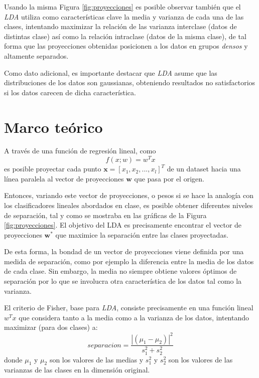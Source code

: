 \documentclass[journal]{IEEEtran}
\begin{document}
Usando la misma Figura \ref{fig:proyecciones} es posible observar también que el \emph{LDA} utiliza como características clave la media y varianza de cada una de las clases, intentando maximizar la relación de las varianza interclase (datos de distintas clase) así como la relación intraclase (datos de la misma clase), de tal forma que las proyecciones obtenidas posicionen a los datos en grupos \emph{densos} y altamente separados.

Como dato adicional, es importante destacar que \emph{LDA} asume que las distribuciones de los datos son gaussianas, obteniendo resultados no satisfactorios si los datos carecen de dicha característica.

\section{Marco teórico}
A través de una función de regresión lineal, como $$f(x;w) = w^Tx$$ es posible proyectar cada punto $\mathbf{x} = [x_1,x_2,...,x_l]^T$ de un dataset hacia una línea paralela al vector de proyecciones $\mathbf{w}$ que pasa por el origen.

Entonces, variando este vector de proyecciones, o pesos si se hace la analogía con los clasificadores lineales abordados en clase, es posible obtener diferentes niveles de separación, tal y como se mostraba en las gráficas de la Figura \ref{fig:proyecciones}.
El objetivo del LDA es precisamente encontrar el vector de proyecciones $\mathbf{w^*}$ que maximice la separación entre las clases proyectadas.

De esta forma, la bondad de un vector de proyecciones viene definida por una medida de separación, como por ejemplo la diferencia entre la media de los datos de cada clase.
Sin embargo, la media no siempre obtiene valores óptimos de separación por lo que se involucra otra característica de los datos tal como la varianza.

El criterio de Fisher, base para \emph{LDA}, consiste precisamente en una función lineal $w^Tx$ que considera tanto a la media como a la varianza de los datos, intentando maximizar (para dos clases) a:
\begin{equation}
separacion= \frac{|( \mu_1 - \mu_2 ) |^2}{s_1^2 + s_2^2} \label{eq:criterio-fisher}
\end{equation}
donde $\mu_1$ y $\mu_2$ son los valores de las medias y $s_1^2$ y $s_2^2$ son los valores de las varianzas de las clases en la dimensión original.
\end{document}
